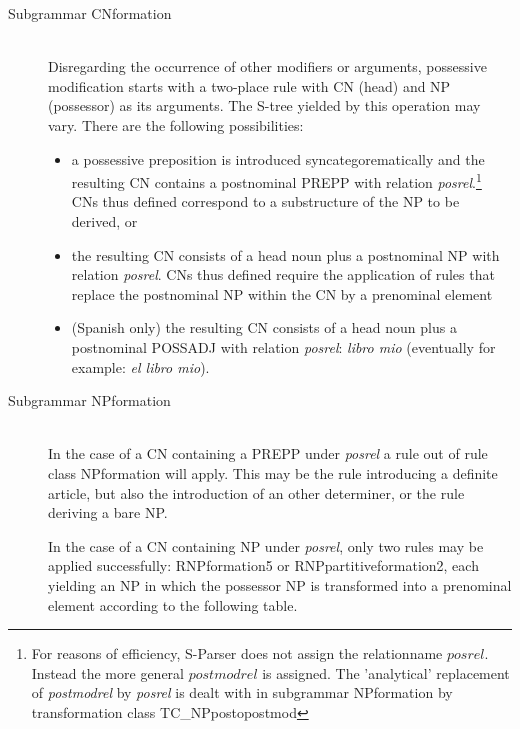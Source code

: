 \begin{description}
  \item [Subgrammar CNformation]\mbox{}\\ 
\noindent
Disregarding the occurrence of other modifiers or arguments, possessive 
modification starts with a two-place rule with CN (head) and NP  (possessor)
as its arguments. The S-tree yielded by this operation may vary. 
There are the following possibilities: 

\begin{itemize}
  \item 
a possessive preposition is introduced 
syncategorematically and the resulting CN contains a 
postnominal PREPP with relation {\em posrel}.\footnote{For reasons of 
efficiency, S-Parser does not assign the relationname $posrel$. Instead the 
more general $postmodrel$ is assigned. The 'analytical'
replacement of {\em postmodrel}
 by {\em posrel} is dealt with in subgrammar NPformation 
by transformation class TC\_NPpostopostmod} CNs thus defined correspond to 
a substructure of the NP to be derived, or 
  \item
the resulting CN consists of a head noun plus a postnominal NP with relation
{\em posrel}. CNs thus defined require the application of rules that replace the 
postnominal NP within the CN by a prenominal element
\item 
(Spanish only)  
the resulting CN consists of a head noun plus a postnominal POSSADJ 
with relation {\em posrel}: {\em libro mio} (eventually for example: 
{\em el libro mio}).
\end{itemize}

  \item [Subgrammar NPformation]\mbox{}\\ 
\noindent
In the case of a CN containing a PREPP under {\em posrel} a rule out of rule 
class NPformation will apply. This may be the 
rule introducing a definite article, but also the introduction of an other 
determiner, or the rule deriving a bare NP. 

In the case of a CN containing  NP under {\em posrel}, only two rules 
may be 
applied 
successfully: RNPformation5 or RNPpartitiveformation2, each  
yielding an NP in which the possessor 
NP is transformed into a prenominal element according to the following table.\\



\end{description}
